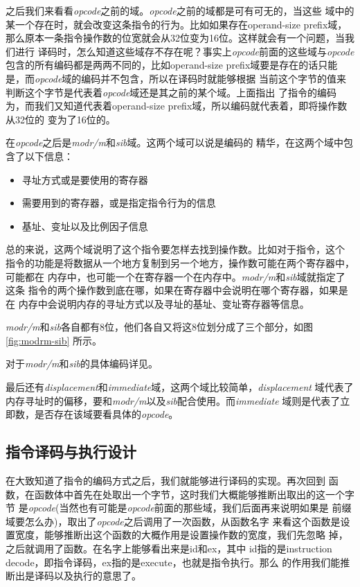 之后我们来看看\emph{opcode}之前的域。\emph{opcode}之前的域都是可有可无的，当这些
域中的某一个存在时，就会改变这条指令的行为。比如如果存在operand-size prefix域，
那么原本一条指令操作数的位宽就会从32位变为16位。这样就会有一个问题，当我们进行
译码时，怎么知道这些域存不存在呢？事实上\emph{opcode}前面的这些域与\emph{opcode}
包含的所有编码都是两两不同的，比如operand-size prefix域要是存在的话只能
是，而\emph{opcode}域的编码并不包含，所以在译码时就能够根据
当前这个字节的值来判断这个字节是代表着\emph{opcode}域还是其之前的某个域。上面指出
了指令的编码为，而我们又知道代表着operand-size
prefix域，所以编码就代表着，即将操作数从32位的
变为了16位的。

在\emph{opcode}之后是\emph{modr/m}和\emph{sib}域。这两个域可以说是\arch 编码的
精华，在这两个域中包含了以下信息：
\begin{itemize}
  \item 寻址方式或是要使用的寄存器
  \item 需要用到的寄存器，或是指定指令行为的信息
  \item 基址、变址以及比例因子信息
\end{itemize}

总的来说，这两个域说明了这个指令要怎样去找到操作数。比如对于指令，这个
指令的功能是将数据从一个地方复制到另一个地方，操作数可能在两个寄存器中，可能都在
内存中，也可能一个在寄存器一个在内存中。\emph{modr/m}和\emph{sib}域就指定了这条
指令的两个操作数到底在哪，如果在寄存器中会说明在哪个寄存器，如果是在
内存中会说明内存的寻址方式以及寻址的基址、变址寄存器等信息。

\emph{modr/m}和\emph{sib}各自都有8位，他们各自又将这8位划分成了三个部分，如图\ref{fig:modrm-sib}
所示。


对于\emph{modr/m}和\emph{sib}的具体编码详见\cite{i386-manual}。

最后还有\emph{displacement}和\emph{immediate}域，这两个域比较简单，\emph{displacement}
域代表了内存寻址时的偏移，要和\emph{modr/m}以及\emph{sib}配合使用。而\emph{immediate}
域则是代表了立即数，是否存在该域要看具体的\emph{opcode}。

\subsection{\arch 指令译码与执行设计}\label{sec:x86-instr-format}
在大致知道了\arch 指令的编码方式之后，我们就能够进行译码的实现。再次回到
函数，在函数体中首先在\pc 处取出一个字节，这时我们大概能够推断出取出的这一个字节
是\emph{opcode}(当然也有可能是\emph{opcode}前面的那些域，我们后面再来说明如果是
前缀域要怎么办)，取出了\emph{opcode}之后调用了一次函数，从函数名字
来看这个函数是设置宽度，能够推断出这个函数的大概作用是设置操作数的宽度，我们先忽略
掉，之后就调用了函数。在名字上能够看出来是id和ex，其中
id指的是instruction decode，即指令译码，ex指的是execute，也就是指令执行。那么
的作用我们能推断出是译码以及执行的意思了。

